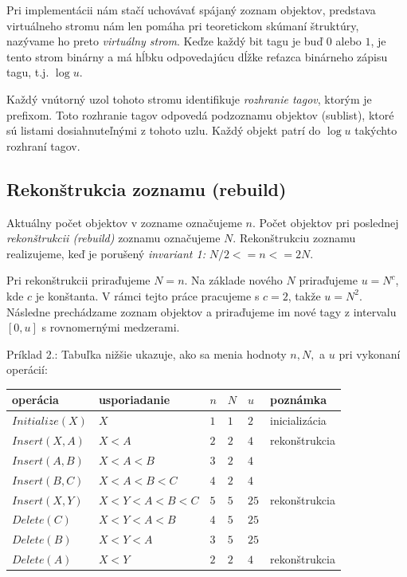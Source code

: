 \documentclass[
  digital,     %
  oneside,     %
  nosansbold,  %
  nocolorbold, %
  lof,         %
  lot,         %
]{fithesis4}
\begin{document}
Pri implementácii nám stačí uchovávať spájaný zoznam objektov, predstava virtuálneho stromu nám len pomáha pri teoretickom skúmaní štruktúry, nazývame ho preto \textit{virtuálny strom}. Keďze každý bit tagu je buď $0$ alebo $1$, je tento strom binárny a má hĺbku odpovedajúcu dĺžke reťazca binárneho zápisu tagu, t.j. $\log{u}$.

Každý vnútorný uzol tohoto stromu identifikuje \textit{rozhranie tagov}, ktorým je prefixom. Toto rozhranie tagov odpovedá podzoznamu objektov (sublist), ktoré sú listami dosiahnuteľnými z tohoto uzlu. Každý objekt patrí do $\log{u}$ takýchto rozhraní tagov.

\subsection{Rekonštrukcia zoznamu (rebuild)}

Aktuálny počet objektov v zozname označujeme $n$. Počet objektov pri poslednej \textit{rekonštrukcii (rebuild)} zoznamu označujeme $N$. Rekonštrukciu zoznamu realizujeme, keď je porušený \textit{invariant 1:} $N/2 <= n <= 2N$.

Pri rekonštrukcii priraďujeme $N = n$. Na základe nového $N$ priraďujeme $u = N^c$, kde $c$ je konštanta. V rámci tejto práce pracujeme s $c = 2$, takže $u = N^2$. Následne prechádzame zoznam objektov a priraďujeme im nové tagy z intervalu $[0, u]$ s rovnomernými medzerami.

Príklad 2.:
Tabuľka nižšie ukazuje, ako sa menia hodnoty $n, N,$ a $u$ pri vykonaní operácií:
\begin{table}
\begin{tabularx}{\textwidth}{| l | l | l | l | l | l}
    operácia & usporiadanie & $n$ & $N$ & $u$ & poznámka \\
    \midrule
    $Initialize(X)$ & $X$ & $1$ & $1$ & $2$ & inicializácia\\
    $Insert(X, A)$ & $X < A$ & $2$ & $2$ & $4$ & rekonštrukcia\\
    $Insert(A, B)$ & $X < A < B$ & $3$ & $2$ & $4$ & \\
    $Insert(B, C)$ & $X < A < B < C$ & $4$ & $2$ & $4$ & \\
    $Insert(X, Y)$ & $X < Y < A < B < C$ & $5$ & $5$ & $25$ & rekonštrukcia\\
    $Delete(C)$ & $X < Y < A < B$ & $4$ & $5$ & $25$ & \\
    $Delete(B)$ & $X < Y < A $ & $3$ & $5$ & $25$ & \\
    $Delete(A)$ & $X < Y$ & $2$ & $2$ & $4$ & rekonštrukcia\\
  \end{tabularx}
\end{table}
\end{document}
